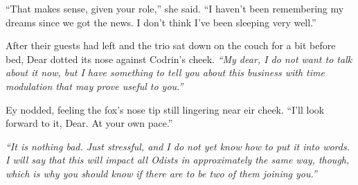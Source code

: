 ``That makes sense, given your role,'' she said. ``I haven't been remembering my dreams since we got the news. I don't think I've been sleeping very well.''

After their guests had left and the trio sat down on the couch for a bit before bed, Dear dotted its nose against Codrin's cheek. \emph{``My dear, I do not want to talk about it now, but I have something to tell you about this business with time modulation that may prove useful to you.''}

Ey nodded, feeling the fox's nose tip still lingering near eir cheek. ``I'll look forward to it, Dear. At your own pace.''

\emph{``It is nothing bad. Just stressful, and I do not yet know how to put it into words. I will say that this will impact all Odists in approximately the same way, though, which is why you should know if there are to be two of them joining you.''}
